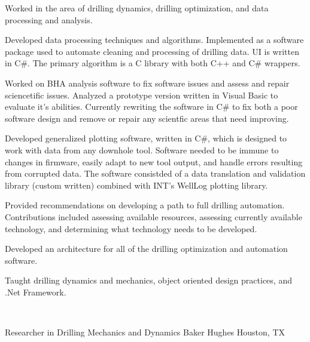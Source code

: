 \documentclass{resume}
\begin{document}
					\vspace*{-6pt}
					\noindent Worked in the area of drilling dynamics, drilling optimization, and data processing and analysis.
		\begin{bulletedlist}
			
		\item 
					Developed data processing techniques and algorithms.  Implemented as a software package used to automate cleaning and processing of
					drilling data.  UI is written in C\#.  The primary algorithm is a C library with both C++ and C\# wrappers.
				
		\item 
					Worked on BHA analysis software to fix software issues and assess and repair sciencetific issues.  Analyzed a prototype version
					written in Visual Basic to evaluate it's abilities.  Currently rewriting the software in C\# to fix both a poor software design
					and remove or repair any scientfic areas that need improving.
				
		\item 
					Developed generalized plotting software, written in C\#, which is designed to work with data from any downhole tool.  Software
					needed to be immune to changes in firmware, easily adapt to new tool output, and handle errors resulting from corrupted data.
					The software consistded of a data translation and validation library (custom written) combined with INT's WellLog plotting library.
				
		\item 
					Provided recommendations on developing a path to full drilling automation.  Contributions included assessing available resources, assessing currently available technology, and determining what technology needs to be developed.
				
		\item 
					Developed an architecture for all of the drilling optimization and automation software.
				
		\item 
					Taught drilling dynamics and mechanics, object oriented design practices, and .Net Framework.
				
		\end{bulletedlist}
			\vspace*{-12pt}
	\hspace*{0pt}\\ \vspace*{-2pt}
				
            {Researcher in Drilling Mechanics and Dynamics}
            {Baker Hughes}
			{Houston, TX}
			
\end{document}
